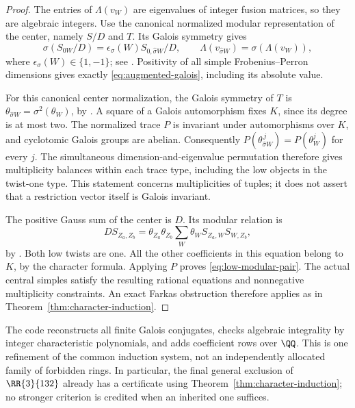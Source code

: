 \begin{proof}
The entries of $\Lambda(v_W)$ are eigenvalues of integer fusion
matrices, so they are algebraic integers. Use the canonical normalized
modular representation of the center, namely $S/D$ and $T$. Its Galois
symmetry gives
\[
 \sigma(S_{0W}/D)=\epsilon_\sigma(W)S_{0,\widehat\sigma W}/D,
 \qquad
 \Lambda(v_{\widehat\sigma W})=\sigma(\Lambda(v_W)),
\]
where $\epsilon_\sigma(W)\in\{1,-1\}$; see
\cite[equations~(2.12)--(2.13)]{BNRW}. Positivity of all simple
Frobenius--Perron dimensions gives exactly
\eqref{eq:augmented-galois}, including its absolute value.

For this canonical center normalization, the Galois symmetry of $T$
is $\theta_{\widehat\sigma W}=\sigma^2(\theta_W)$, by
\cite[Theorem~2.9(b)]{BNRW}. A square of a Galois automorphism fixes
$K$, since its degree is at most two. The normalized trace $P$ is
invariant under automorphisms over $K$, and cyclotomic Galois groups
are abelian. Consequently
$P(\theta_{\widehat\sigma W}^{\,j})=P(\theta_W^j)$ for every $j$.
The simultaneous dimension-and-eigenvalue permutation therefore gives
multiplicity balances within each trace type, including the low objects
in the twist-one type. This statement concerns multiplicities of tuples;
it does not assert that a restriction vector itself is Galois invariant.

The positive Gauss sum of the center is $D$. Its modular relation is
\[
 D S_{Z_a,Z_b}
    =\theta_{Z_a}\theta_{Z_b}\sum_W\theta_W S_{Z_a,W}S_{W,Z_b},
\]
by \cite[equation~(2.6)]{BNRW}. Both low twists are one. All the other
coefficients in this equation belong to $K$, by the character formula.
Applying $P$ proves \eqref{eq:low-modular-pair}. The actual central
simples satisfy the resulting rational equations and nonnegative
multiplicity constraints. An exact Farkas obstruction therefore applies
as in Theorem~\ref{thm:character-induction}.
\end{proof}

The code reconstructs all finite Galois conjugates, checks algebraic
integrality by integer characteristic polynomials, and adds coefficient
rows over $\QQ$. This is one refinement of the common induction system,
not an independently allocated family of forbidden rings. In particular,
the final general exclusion of $\RR{3}{132}$ already has a certificate
using Theorem~\ref{thm:character-induction}; no stronger criterion is
credited when an inherited one suffices.

